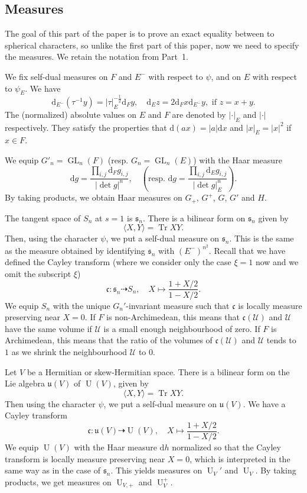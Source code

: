 \documentclass[letterpaper,11pt]{amsart}
\newcommand{\fc}{\mathfrak{c}}
\newcommand{\fs}{\mathfrak{s}}
\newcommand{\fu}{\mathfrak{u}}
\newcommand{\cU}{\mathcal{U}}
\newcommand{\rd}{\mathrm{d}}
\newcommand{\<}{\negthickspace}
\providecommand{\abs}[1]{\lvert#1\rvert}
\newcommand{\valP}[1]{\left|#1\right|}
\DeclareMathOperator{\Tr}{Tr}
\DeclareMathOperator{\GL}{GL}
\DeclareMathOperator{\U}{U}
\theoremstyle{definition}
\theoremstyle{plain}
\theoremstyle{remark}
\numberwithin{equation}{section}
\begin{document}
\subsection{Measures}   \label{subsec:measure_local}
The goal of this part of the paper is to prove an exact equality between to spherical characters, so unlike the first part of this paper, now we need to specify the measures. We retain the notation from Part~1.

We fix self-dual measures on $F$ and $E^-$ with respect to $\psi$, and on $E$
with respect to $\psi_E$. We have
    \[
    \rd_{E^-} (\tau^{-1}y) = \abs{\tau}_E^{-\frac{1}{2}} \rd_F y, \quad
    \rd_E z = 2 \rd_F x \rd_{E^-} y, \text{ if $z = x+y$}.
    \]
The (normalized) absolute values on $E$ and $F$ are denoted by
$\abs{\cdot}_E$ and $\abs{\cdot}$ respectively. They satisfy the properties
that $\rd (ax) = \abs{a} \rd x$ and $\abs{x}_E = \abs{x}^2$ if $x \in F$.

We equip $G'_n = \GL_n(F)$ (resp. $G_n=\GL_n(E)$) with the Haar measure
\begin{equation*}
   \rd g= \frac{ \prod_{i,j} \rd_F g_{i,j}}{\valP{\det g}^n}, \quad \left( \text{resp. }  \rd g= \frac{ \prod_{i,j} \rd_E g_{i,j}}{\valP{\det g}_E^n} \right).
\end{equation*}
By taking products, we obtain Haar measures on $G_+$, $G^+$, $G$, $G'$ and $H$.


The tangent space of $S_n$ at $s = 1$ is $\fs_n$. There is a bilinear form on
$\fs_n$ given by
    \[
    \langle X, Y \rangle = \Tr XY.
    \]
Then, using the character $\psi$, we put a self-dual measure on $\fs_n$. This
is the same as the measure obtained by identifying $\fs_n$ with
$(E^-)^{n^2}$. Recall that we have defined the Cayley transform (where we
consider only the case $\xi = 1$ now and we omit the subscript $\xi$)
    \[
    \fc: \fs_n \dashrightarrow S_n, \quad
    X \mapsto \frac{1+X/2}{1-X/2}.
    \]
We equip $S_n$ with the unique $G_n'$-invariant measure such that $\fc$ is locally measure preserving near $X = 0$. If $F$ is
non-Archimedean, this means that $\fc(\cU)$ and $\cU$ have the same volume if $\cU$ is
a small enough neighbourhood of zero. If $F$ is Archimedean, this means that the
ratio of the volumes of $\fc(\cU)$ and $\cU$ tends to $1$ as we shrink the
neighbourhood $\cU$ to $0$.

Let $V$ be a Hermitian or skew-Hermitian space. There is a bilinear form on
the Lie algebra $\fu(V)$ of $\U(V)$, given by
    \[
    \langle X, Y \rangle = \Tr XY.
    \]
Then using the character $\psi$, we put a self-dual measure on $\fu(V)$. We
have a Cayley transform
    \[
    \fc: \fu(V) \dashrightarrow \U(V), \quad
    X \mapsto \frac{1+X/2}{1-X/2}.
    \]
We equip $\U(V)$ with the Haar measure $\rd h$ normalized so that the Cayley transform is
locally measure preserving near $X = 0$, which is interpreted in the same way
as in the case of $\fs_n$. This yields measures on $\U_V'$ and $\U_V$. By taking products, we get measures on $\U_{V, +}$ and $\U_V^+$.
\end{document}
